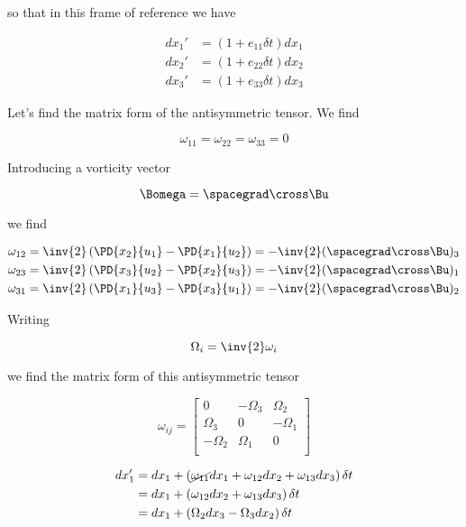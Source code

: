 so that in this frame of reference we have

\begin{align}\label{eqn:continuumL8:310}
dx_1' &= ( 1 + e_{11} \delta t) dx_1 \\
dx_2' &= ( 1 + e_{22} \delta t) dx_2 \\
dx_3' &= ( 1 + e_{33} \delta t) dx_3
\end{align}

Let's find the matrix form of the antisymmetric tensor.  We find

\begin{equation}\label{eqn:continuumL8:330}
\omega_{11} = \omega_{22} = \omega_{33} = 0
\end{equation}

Introducing a vorticity vector

\begin{equation}\label{eqn:continuumL8:350}
\Bomega = \spacegrad \cross \Bu
\end{equation}

we find

\begin{align}\label{eqn:continuumL8:370}
\omega_{12} &= \inv{2}\left( \PD{x_2}{u_1} -\PD{x_1}{u_2} \right) = - \inv{2} (\spacegrad \cross \Bu)_3 \\
\omega_{23} &= \inv{2}\left( \PD{x_3}{u_2} -\PD{x_2}{u_3} \right) = - \inv{2} (\spacegrad \cross \Bu)_1 \\
\omega_{31} &= \inv{2}\left( \PD{x_1}{u_3} -\PD{x_3}{u_1} \right) = - \inv{2} (\spacegrad \cross \Bu)_2
\end{align}

Writing

\begin{equation}\label{eqn:continuumL8:390}
\Omega_i = \inv{2} \omega_i
\end{equation}

we find the matrix form of this antisymmetric tensor

\begin{equation}\label{eqn:continuumL8:410}
\omega_{ij}
=
\begin{bmatrix}
0 & -\Omega_3 & \Omega_2 \\
\Omega_3 & 0 & -\Omega_1 \\
-\Omega_2 & \Omega_1 & 0 \\
\end{bmatrix}
\end{equation}

\begin{align*}
dx_1'
&= dx_1 + \left( \cancel{\omega_{11}} dx_1 + \omega_{12} dx_2 + \omega_{13} dx_3 \right) \delta t \\
&= dx_1 + \left( \omega_{12} dx_2 + \omega_{13} dx_3 \right) \delta t \\
&= dx_1 + \left( \Omega_2 dx_3 - \Omega_3 dx_2 \right) \delta t
\end{align*}

